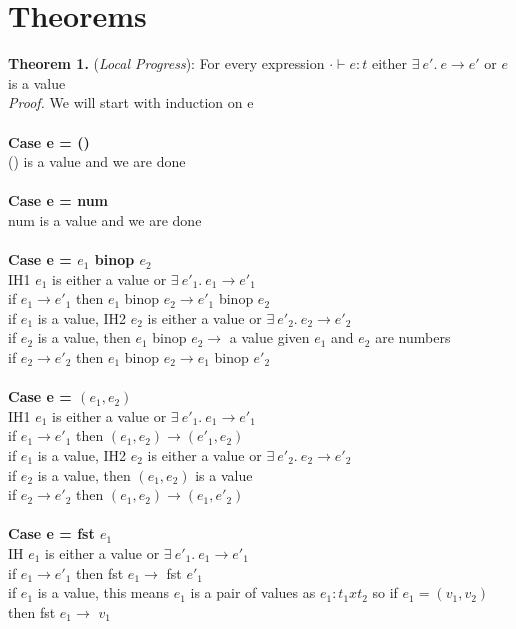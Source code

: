 \documentclass{article}
\begin{document}
\section{Theorems}
\textbf{Theorem 1.} (\textit{Local Progress}): For every expression $\cdot \vdash e : t$ either $  \exists \ e'.\ e \to e'$  or $e$ is a value
  \\
\textit{Proof.} We will start with induction on e \\\\
\textbf{Case e = ()} \\
() is a value and we are done \\ \\
\textbf{Case e = num} \\
num is a value and we are done \\ \\
\textbf{Case e = $e_1$ binop $e_2$} \\
IH1 $e_1$ is either a value or $  \exists \ e'_1.\ e_1 \to e'_1 $ \\
if $e_1 \to e'_1$ then $e_1$ binop $e_2 \to e'_1$ binop $e_2$ \\
if $e_1$ is a value, IH2 $e_2$ is either a value or $  \exists \ e'_2.\ e_2 \to e'_2 $ \\
if $e_2$ is a value, then $e_1$ binop $e_2 \to$ a value given $e_1$ and $e_2$ are numbers \\
if $e_2 \to e'_2$ then $e_1$ binop $e_2 \to e_1$ binop $e'_2$ \\ \\
\textbf{Case e = $(e_1,e_2)$} \\
IH1 $e_1$ is either a value or $  \exists \ e'_1.\ e_1 \to e'_1 $ \\
if $e_1 \to e'_1$ then $(e_1,e_2) \to (e'_1, e_2)$\\
if $e_1$ is a value, IH2 $e_2$ is either a value or $  \exists \ e'_2.\ e_2 \to e'_2 $ \\
if $e_2$ is a value, then $(e_1,e_2)$ is a value \\
if $e_2 \to e'_2$ then $(e_1,e_2) \to (e_1,e'_2)$ \\ \\
\textbf{Case e = fst $e_1$} \\
IH $e_1$ is either a value or $  \exists \ e'_1.\ e_1 \to e'_1 $ \\
if $e_1 \to e'_1$ then fst $e_1 \to$ fst $e'_1$\\
if $e_1$ is a value, this means $e_1$ is a pair of values as $e_1: t_1 x t_2$
 so if $e_1 = (v_1, v_2)$ then fst $e_1 \to$ $v_1$\\ \\
\end{document}

